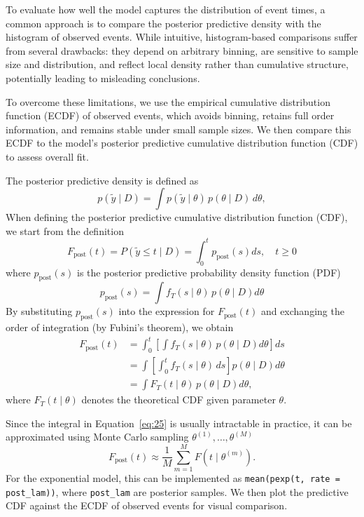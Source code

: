 To evaluate how well the model captures the distribution of event times, a common approach is to compare the posterior predictive density with the histogram of observed events. While intuitive, histogram-based comparisons suffer from several drawbacks: they depend on arbitrary binning, are sensitive to sample size and distribution, and reflect local density rather than cumulative structure, potentially leading to misleading conclusions.

To overcome these limitations, we use the empirical cumulative distribution function (ECDF) of observed events, which avoids binning, retains full order information, and remains stable under small sample sizes. We then compare this ECDF to the model’s posterior predictive cumulative distribution function (CDF) to assess overall fit.

The posterior predictive density is defined as
\begin{equation}
    p(\tilde{y} \mid D) = \int p(\tilde{y} \mid \theta) \, p(\theta \mid D) \, d\theta,
\end{equation}
When defining the posterior predictive cumulative distribution function (CDF), we start from the definition
\begin{equation}
F_{\text{post}}(t)
= P(\tilde{y} \le t \mid D)
= \int_0^{t} p_{\text{post}}(s) ds, \quad t\ge 0
\end{equation}
where $p_{\text{post}}(s)$ is the posterior predictive probability density function (PDF)
\begin{equation}
p_{\text{post}}(s)
= \int f_T(s\mid\theta)\,p(\theta \mid D) d\theta
\end{equation}
By substituting $p_{\text{post}}(s)$ into the expression for $F_{\text{post}}(t)$ and exchanging the order of integration (by Fubini's theorem), we obtain
\begin{align}
F_{\text{post}}(t)
&= \int_0^{t} 
\left[ \int f_T(s\mid\theta)\,p(\theta \mid D) d\theta \right] ds \\[6pt]
&= \int \left[ \int_0^{t} f_T(s\mid\theta)\, ds \right] p(\theta \mid D) d\theta \\[6pt]
&= \int F_T(t\mid\theta)\, p(\theta \mid D) d\theta,
\label{eq:25}
\end{align}
where $F_T(t\mid\theta)$ denotes the theoretical CDF given parameter $\theta$.

Since the integral in Equation~\eqref{eq:25} is usually intractable in practice, it can be approximated using Monte Carlo sampling $\theta^{(1)}, \dots, \theta^{(M)}$
\begin{equation}
    F_{\text{post}}(t) \approx \frac{1}{M} \sum_{m=1}^M F(t \mid \theta^{(m)}).
\end{equation}
For the exponential model, this can be implemented as \texttt{mean(pexp(t, rate = post\_lam))}, where \texttt{post\_lam} are posterior samples. We then plot the predictive CDF against the ECDF of observed events for visual comparison.
